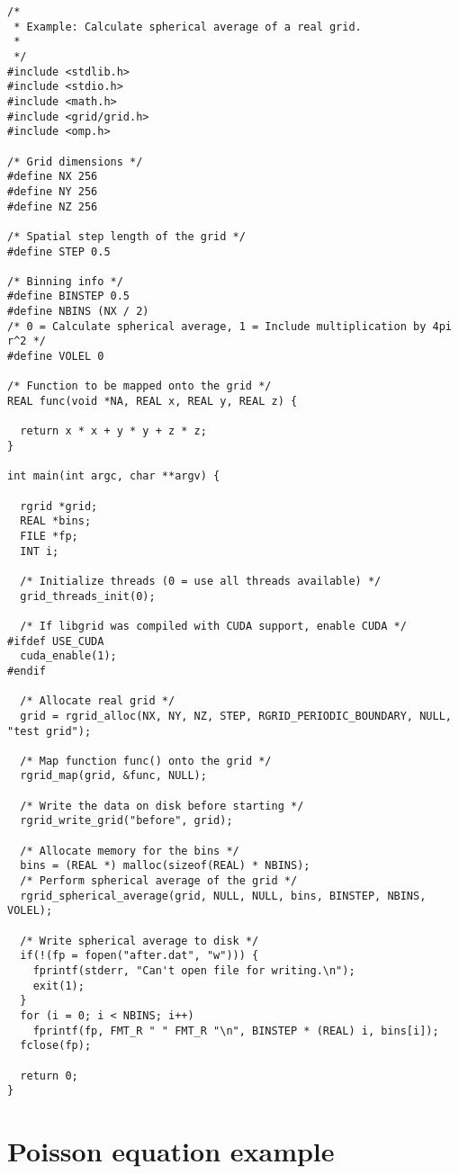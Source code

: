 \documentclass[12pt,letterpaper]{report}
\begin{document}
\begin{verbatim}
/*
 * Example: Calculate spherical average of a real grid.
 *
 */
#include <stdlib.h>
#include <stdio.h>
#include <math.h>
#include <grid/grid.h>
#include <omp.h>

/* Grid dimensions */
#define NX 256
#define NY 256
#define NZ 256

/* Spatial step length of the grid */
#define STEP 0.5

/* Binning info */
#define BINSTEP 0.5
#define NBINS (NX / 2)
/* 0 = Calculate spherical average, 1 = Include multiplication by 4pi r^2 */
#define VOLEL 0   

/* Function to be mapped onto the grid */
REAL func(void *NA, REAL x, REAL y, REAL z) {

  return x * x + y * y + z * z;
}

int main(int argc, char **argv) {

  rgrid *grid;
  REAL *bins;
  FILE *fp;
  INT i;
 
  /* Initialize threads (0 = use all threads available) */
  grid_threads_init(0);

  /* If libgrid was compiled with CUDA support, enable CUDA */
#ifdef USE_CUDA
  cuda_enable(1);
#endif
  
  /* Allocate real grid */
  grid = rgrid_alloc(NX, NY, NZ, STEP, RGRID_PERIODIC_BOUNDARY, NULL, "test grid");

  /* Map function func() onto the grid */
  rgrid_map(grid, &func, NULL);

  /* Write the data on disk before starting */
  rgrid_write_grid("before", grid);

  /* Allocate memory for the bins */
  bins = (REAL *) malloc(sizeof(REAL) * NBINS);
  /* Perform spherical average of the grid */
  rgrid_spherical_average(grid, NULL, NULL, bins, BINSTEP, NBINS, VOLEL);

  /* Write spherical average to disk */
  if(!(fp = fopen("after.dat", "w"))) {
    fprintf(stderr, "Can't open file for writing.\n");
    exit(1);
  }
  for (i = 0; i < NBINS; i++)
    fprintf(fp, FMT_R " " FMT_R "\n", BINSTEP * (REAL) i, bins[i]);
  fclose(fp);

  return 0;
}
\end{verbatim}

\section{Poisson equation example}
\end{document}
